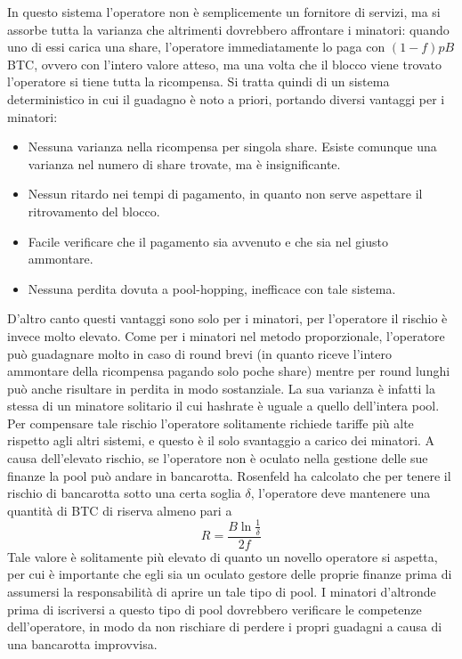 In questo sistema l'operatore non è semplicemente un fornitore di servizi, ma si assorbe tutta la varianza che altrimenti dovrebbero affrontare i minatori: quando uno di essi carica una share, l'operatore immediatamente lo paga con $(1-f)pB$ BTC, ovvero con l'intero valore atteso, ma una volta che il blocco viene trovato l'operatore si tiene tutta la ricompensa.
Si tratta quindi di un sistema deterministico in cui il guadagno è noto a priori, portando diversi vantaggi per i minatori:
\begin{itemize}
    \item Nessuna varianza nella ricompensa per singola share. Esiste comunque una varianza nel numero di share trovate, ma è insignificante.
    \item Nessun ritardo nei tempi di pagamento, in quanto non serve aspettare il ritrovamento del blocco.
    \item Facile verificare che il pagamento sia avvenuto e che sia nel giusto ammontare.
    \item Nessuna perdita dovuta a pool-hopping, inefficace con tale sistema.
\end{itemize}
D'altro canto questi vantaggi sono solo per i minatori, per l'operatore il rischio è invece molto elevato. Come per i minatori nel metodo proporzionale, l'operatore può guadagnare molto in caso di round brevi (in quanto riceve l'intero ammontare della ricompensa pagando solo poche share) mentre per round lunghi può anche risultare in perdita in modo sostanziale. La sua varianza è infatti la stessa di un minatore solitario il cui hashrate è uguale a quello dell'intera pool. Per compensare tale rischio l'operatore solitamente richiede tariffe più alte rispetto agli altri sistemi, e questo è il solo svantaggio a carico dei minatori.
A causa dell'elevato rischio, se l'operatore non è oculato nella gestione delle sue finanze la pool può andare in bancarotta. Rosenfeld ha calcolato che per tenere il rischio di bancarotta sotto una certa soglia $\delta$, l'operatore deve mantenere una quantità di BTC di riserva almeno pari a
\[R = \frac{B \ln\frac{1}{\delta} }{2f}\]
Tale valore è solitamente più elevato di quanto un novello operatore si aspetta, per cui è importante che egli sia un oculato gestore delle proprie finanze prima di assumersi la responsabilità di aprire un tale tipo di pool. I minatori d'altronde prima di iscriversi a questo tipo di pool dovrebbero verificare le competenze dell'operatore, in modo da non rischiare di perdere i propri guadagni a causa di una bancarotta improvvisa.

